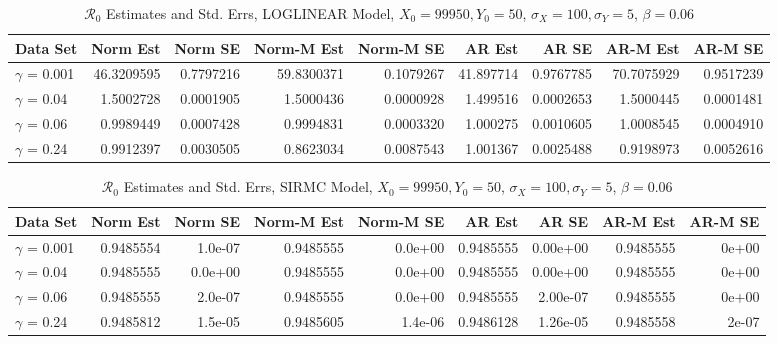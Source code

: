 \documentclass[12pt]{article}
\newcommand{\rr}{\ensuremath{\mathcal{R}_0}}
\begin{document}
\begin{table}[H]
	
	\caption{\label{tab:}$\rr$ Estimates and Std. Errs, LOGLINEAR Model,
		$X_0 = 99950, Y_0 = 50$, $\sigma_X = 100, \sigma_Y = 5$, $\beta = 0.06$}
	\centering
	\begin{footnotesize}
	\begin{tabular}[t]{l|r|r|r|r|r|r|r|r}
		\hline
		Data Set & Norm Est & Norm SE & Norm-M Est & Norm-M SE & AR Est & AR SE & AR-M Est & AR-M SE\\
		\hline
		$\gamma$ = 0.001 & 46.3209595 & 0.7797216 & 59.8300371 & 0.1079267 & 41.897714 & 0.9767785 & 70.7075929 & 0.9517239\\
		\hline
		$\gamma$ = 0.04 & 1.5002728 & 0.0001905 & 1.5000436 & 0.0000928 & 1.499516 & 0.0002653 & 1.5000445 & 0.0001481\\
		\hline
		$\gamma$ = 0.06 & 0.9989449 & 0.0007428 & 0.9994831 & 0.0003320 & 1.000275 & 0.0010605 & 1.0008545 & 0.0004910\\
		\hline
		$\gamma$ = 0.24 & 0.9912397 & 0.0030505 & 0.8623034 & 0.0087543 & 1.001367 & 0.0025488 & 0.9198973 & 0.0052616\\
		\hline
	\end{tabular}
\end{footnotesize}
\end{table}
\begin{table}[H]
	
	\caption{\label{tab:}$\rr$ Estimates and Std. Errs, SIRMC Model,
		$X_0 = 99950, Y_0 = 50$, $\sigma_X = 100, \sigma_Y = 5$, $\beta = 0.06$}
	\centering
	\begin{footnotesize}
	\begin{tabular}[t]{l|r|r|r|r|r|r|r|r}
		\hline
		Data Set & Norm Est & Norm SE & Norm-M Est & Norm-M SE & AR Est & AR SE & AR-M Est & AR-M SE\\
		\hline
		$\gamma$ = 0.001 & 0.9485554 & 1.0e-07 & 0.9485555 & 0.0e+00 & 0.9485555 & 0.00e+00 & 0.9485555 & 0e+00\\
		\hline
		$\gamma$ = 0.04 & 0.9485555 & 0.0e+00 & 0.9485555 & 0.0e+00 & 0.9485555 & 0.00e+00 & 0.9485555 & 0e+00\\
		\hline
		$\gamma$ = 0.06 & 0.9485555 & 2.0e-07 & 0.9485555 & 0.0e+00 & 0.9485555 & 2.00e-07 & 0.9485555 & 0e+00\\
		\hline
		$\gamma$ = 0.24 & 0.9485812 & 1.5e-05 & 0.9485605 & 1.4e-06 & 0.9486128 & 1.26e-05 & 0.9485558 & 2e-07\\
		\hline
	\end{tabular}
\end{footnotesize}
\end{table}
\end{document}
